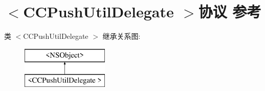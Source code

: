 \hypertarget{protocol_c_c_push_util_delegate_01-p}{}\section{$<$C\+C\+Push\+Util\+Delegate $>$协议 参考}
\label{protocol_c_c_push_util_delegate_01-p}
类 $<$C\+C\+Push\+Util\+Delegate $>$ 继承关系图\+:\begin{figure}[H]
\begin{center}
\leavevmode
\includegraphics[height=2.000000cm]{protocol_c_c_push_util_delegate_01-p}
\end{center}
\end{figure}
